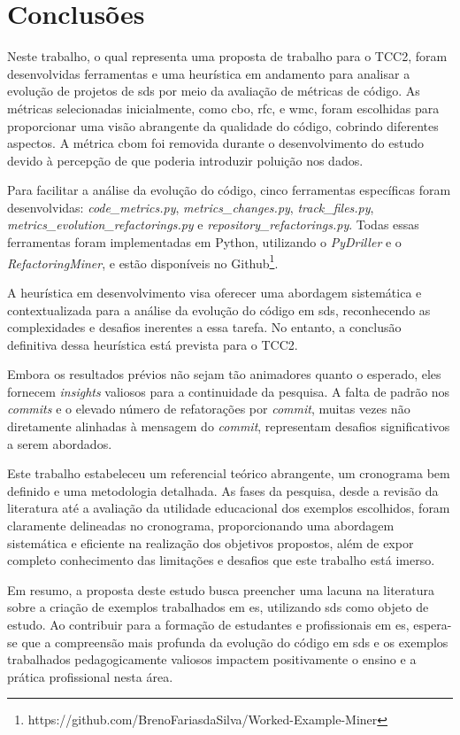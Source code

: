 
\chapter{Conclusões}
\label{cap:conclusoes}

Neste trabalho, o qual representa uma proposta de trabalho para o TCC2, foram desenvolvidas ferramentas e uma heurística em andamento para analisar a evolução de projetos de \gls{sds} por meio da avaliação de métricas de código. As métricas selecionadas inicialmente, como \gls{cbo}, \gls{rfc}, e \gls{wmc}, foram escolhidas para proporcionar uma visão abrangente da qualidade do código, cobrindo diferentes aspectos. A métrica \gls{cbom} foi removida durante o desenvolvimento do estudo devido à percepção de que poderia introduzir poluição nos dados.

Para facilitar a análise da evolução do código, cinco ferramentas específicas foram desenvolvidas: \textit{code\_metrics.py}, \textit{metrics\_changes.py}, \textit{track\_files.py}, \textit{metrics\_evolution\_refactorings.py} e \textit{repository\_refactorings.py}. Todas essas ferramentas foram implementadas em Python, utilizando o \textit{PyDriller} e o \textit{RefactoringMiner}, e estão disponíveis no Github\footnote{https://github.com/BrenoFariasdaSilva/Worked-Example-Miner}.

A heurística em desenvolvimento visa oferecer uma abordagem sistemática e contextualizada para a análise da evolução do código em \gls{sds}, reconhecendo as complexidades e desafios inerentes a essa tarefa. No entanto, a conclusão definitiva dessa heurística está prevista para o TCC2.

Embora os resultados prévios não sejam tão animadores quanto o esperado, eles fornecem \textit{insights} valiosos para a continuidade da pesquisa. A falta de padrão nos \textit{commits} e o elevado número de refatorações por \textit{commit}, muitas vezes não diretamente alinhadas à mensagem do \textit{commit}, representam desafios significativos a serem abordados.

Este trabalho estabeleceu um referencial teórico abrangente, um cronograma bem definido e uma metodologia detalhada. As fases da pesquisa, desde a revisão da literatura até a avaliação da utilidade educacional dos exemplos escolhidos, foram claramente delineadas no cronograma, proporcionando uma abordagem sistemática e eficiente na realização dos objetivos propostos, além de expor completo conhecimento das limitações e desafios que este trabalho está imerso.

Em resumo, a proposta deste estudo busca preencher uma lacuna na literatura sobre a criação de exemplos trabalhados em \gls{es}, utilizando \gls{sds} como objeto de estudo. Ao contribuir para a formação de estudantes e profissionais em \gls{es}, espera-se que a compreensão mais profunda da evolução do código em \gls{sds} e os exemplos trabalhados pedagogicamente valiosos impactem positivamente o ensino e a prática profissional nesta área.